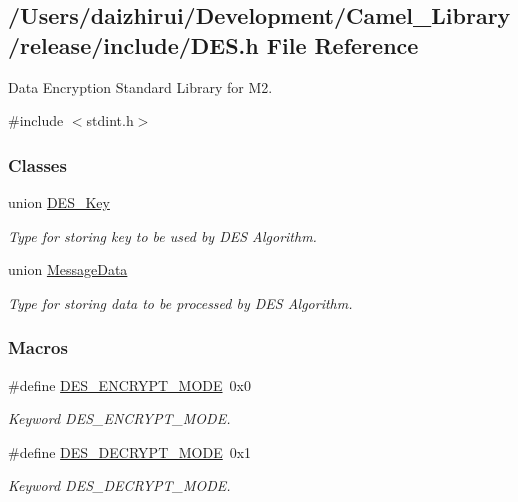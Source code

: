 \hypertarget{a00005}{}\subsection{/\+Users/daizhirui/\+Development/\+Camel\+\_\+\+Library/release/include/\+D\+ES.h File Reference}
\label{a00005}


Data Encryption Standard Library for M2.  


{\ttfamily \#include $<$stdint.\+h$>$}\newline
\subsubsection*{Classes}
\begin{DoxyCompactItemize}
\item 
union \mbox{\hyperlink{a00134}{D\+E\+S\+\_\+\+Key}}
\begin{DoxyCompactList}\small\item\em Type for storing key to be used by D\+ES Algorithm. \end{DoxyCompactList}\item 
union \mbox{\hyperlink{a00138}{Message\+Data}}
\begin{DoxyCompactList}\small\item\em Type for storing data to be processed by D\+ES Algorithm. \end{DoxyCompactList}\end{DoxyCompactItemize}
\subsubsection*{Macros}
\begin{DoxyCompactItemize}
\item 
\mbox{\label{a00005_a73b9a4e1e36c14eb7a44556ee767f106}} 
\#define \mbox{\hyperlink{a00005_a73b9a4e1e36c14eb7a44556ee767f106}{D\+E\+S\+\_\+\+E\+N\+C\+R\+Y\+P\+T\+\_\+\+M\+O\+DE}}~0x0
\begin{DoxyCompactList}\small\item\em Keyword D\+E\+S\+\_\+\+E\+N\+C\+R\+Y\+P\+T\+\_\+\+M\+O\+DE. \end{DoxyCompactList}\item 
\mbox{\label{a00005_a874730b46afa0dd86cf7e3f60bd51165}} 
\#define \mbox{\hyperlink{a00005_a874730b46afa0dd86cf7e3f60bd51165}{D\+E\+S\+\_\+\+D\+E\+C\+R\+Y\+P\+T\+\_\+\+M\+O\+DE}}~0x1
\begin{DoxyCompactList}\small\item\em Keyword D\+E\+S\+\_\+\+D\+E\+C\+R\+Y\+P\+T\+\_\+\+M\+O\+DE. \end{DoxyCompactList}\end{DoxyCompactItemize}
